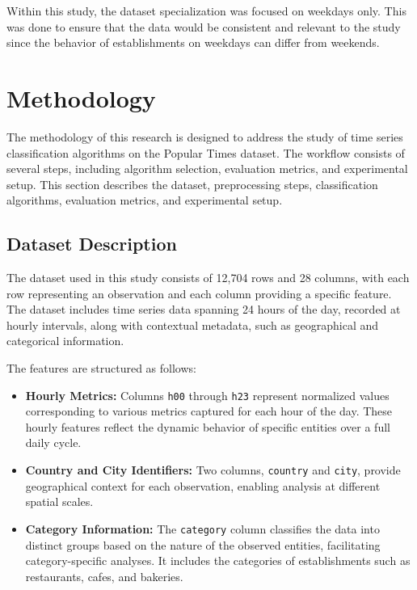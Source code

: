 \documentclass{ieeeaccess}
\begin{document}
Within this study, the dataset specialization was focused on weekdays only. This was done to ensure that the data would be consistent and relevant to the study since the behavior of establishments on weekdays can differ from weekends. 

\section{Methodology}
\label{sec:methodology}

The methodology of this research is designed to address the study of time series classification algorithms on the Popular Times dataset. 
The workflow consists of several steps, including algorithm selection, evaluation metrics, and experimental setup.
This section describes the dataset, preprocessing steps, classification algorithms, evaluation metrics, and experimental setup.

\subsection{Dataset Description}

The dataset used in this study consists of 12,704 rows and 28 columns, with each row representing an observation and each column providing a specific feature. 
The dataset includes time series data spanning 24 hours of the day, recorded at hourly intervals, along with contextual metadata, such as geographical and categorical information.

The features are structured as follows:
\begin{itemize}
    \item \textbf{Hourly Metrics:} Columns \texttt{h00} through \texttt{h23} represent normalized values corresponding to various metrics captured for each hour of the day. These hourly features reflect the dynamic behavior of specific entities over a full daily cycle.
    \item \textbf{Country and City Identifiers:} Two columns, \texttt{country} and \texttt{city}, provide geographical context for each observation, enabling analysis at different spatial scales.
    \item \textbf{Category Information:} The \texttt{category} column classifies the data into distinct groups based on the nature of the observed entities, facilitating category-specific analyses. It includes the categories of establishments such as restaurants, cafes, and bakeries.
\end{itemize}
\end{document}
